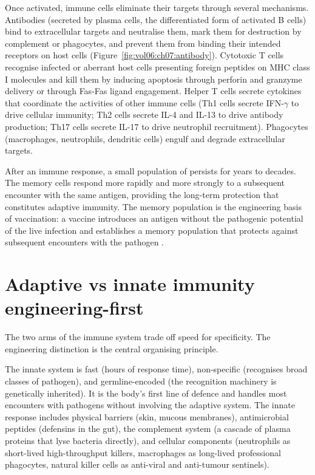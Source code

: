  Once activated, immune cells eliminate
their targets through several mechanisms. Antibodies (secreted by
plasma cells, the differentiated form of activated B cells) bind to
extracellular targets and neutralise them, mark them for destruction
by complement or phagocytes, and prevent them from binding their
intended receptors on host cells (Figure~\ref{fig:vol06:ch07:antibody}).
Cytotoxic T cells recognise infected or aberrant host cells presenting
foreign peptides on MHC class I molecules and kill them by inducing
apoptosis through perforin and granzyme delivery or through Fas-Fas
ligand engagement. Helper T cells secrete cytokines that coordinate
the activities of other immune cells (Th1 cells secrete IFN-$\gamma$
to drive cellular immunity; Th2 cells secrete IL-4 and IL-13 to drive
antibody production; Th17 cells secrete IL-17 to drive neutrophil
recruitment). Phagocytes (macrophages, neutrophils, dendritic cells)
engulf and degrade extracellular targets.



 After an immune response, a small population of
 persists for years to decades. The memory
cells respond more rapidly and more strongly to a subsequent
encounter with the same antigen, providing the long-term protection
that constitutes adaptive immunity. The memory population is the
engineering basis of vaccination: a vaccine introduces an antigen
without the pathogenic potential of the live infection and
establishes a memory population that protects against subsequent
encounters with the pathogen
\cite[ch.~11]{text:v6c07-janeway-immunobiology-2017}.



\section{Adaptive vs innate immunity engineering-first}

The two arms of the immune system trade off speed for specificity.
The engineering distinction is the central organising principle.

 The innate system is fast (hours
of response time), non-specific (recognises broad classes of
pathogen), and germline-encoded (the recognition machinery is
genetically inherited). It is the body's first line of defence and
handles most encounters with pathogens without involving the adaptive
system. The innate response includes physical barriers (skin, mucous
membranes), antimicrobial peptides (defensins in the gut), the
complement system (a cascade of plasma proteins that lyse bacteria
directly), and cellular components (neutrophils as short-lived
high-throughput killers, macrophages as long-lived professional
phagocytes, natural killer cells as anti-viral and anti-tumour
sentinels).

